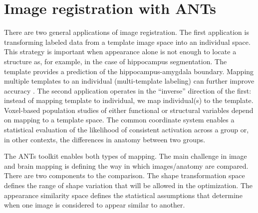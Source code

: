 \documentclass{InsightArticle}
\begin{document}
\section{Image registration with ANTs}
\begin{figure}
\end{figure}
There are two general applications of image registration. The first
application is transforming labeled data from a template image space
into an individual space. This strategy is important when appearance
alone is not enough to locate a structure as, for example, in the case
of hippocampus segmentation. The template provides a prediction of the
hippocampus-amygdala boundary.  Mapping multiple templates to an
individual (multi-template labeling) can further improve accuracy \cite{Wang2011,Avants2011a}.
The second application operates in the ``inverse'' direction of the first: instead of mapping template to individual, we map individual(s) to the template. Voxel-based population studies of either functional or structural variables depend on mapping to a template space. The common coordinate system enables a statistical evaluation of the likelihood of consistent activation across a group or, in other contexts, the differences in anatomy between two groups. 

The ANTs toolkit enables both types of mapping. The main challenge in image and brain mapping is defining the way in which images/anatomy are compared. There are two components to the comparison.
The shape transformation space defines the range of shape variation that will be allowed in the optimization.
The appearance similarity space defines the statistical assumptions that determine when one image is considered to appear similar to another. 
\end{document}
